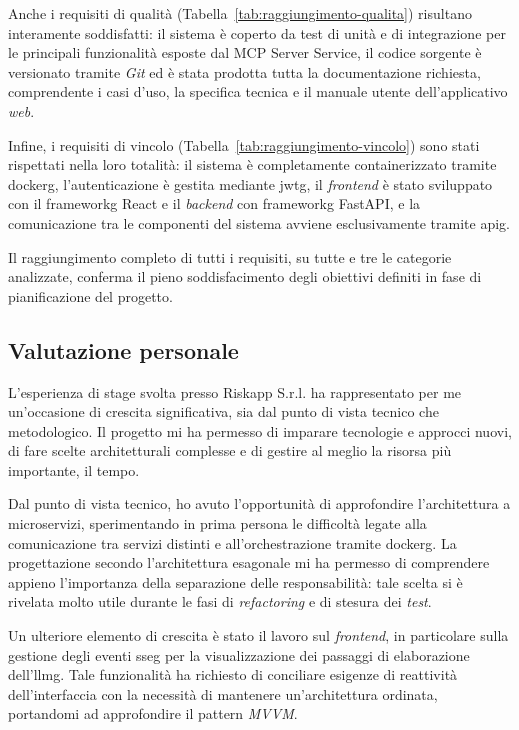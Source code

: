 Anche i requisiti di qualità (Tabella~\ref{tab:raggiungimento-qualita}) risultano 
interamente soddisfatti: il sistema è coperto da test di unità e di integrazione 
per le principali funzionalità esposte dal MCP Server Service, il codice 
sorgente è versionato tramite \textit{Git} ed è stata prodotta tutta la documentazione 
richiesta, comprendente i casi d'uso, la specifica tecnica e il manuale utente 
dell'applicativo \textit{web}.

Infine, i requisiti di vincolo (Tabella~\ref{tab:raggiungimento-vincolo}) sono stati 
rispettati nella loro totalità: il sistema è completamente containerizzato tramite 
\gls{dockerg}, l'autenticazione è gestita mediante \gls{jwtg}, il \textit{frontend} è 
stato sviluppato con il \gls{frameworkg} React e il \textit{backend} con \gls{frameworkg} 
FastAPI, e la comunicazione tra le componenti del sistema avviene esclusivamente tramite 
\gls{apig}.

Il raggiungimento completo di tutti i requisiti, su tutte e tre le categorie analizzate, 
conferma il pieno soddisfacimento degli obiettivi definiti in fase di pianificazione del 
progetto.


\subsection{Valutazione personale}

L'esperienza di stage svolta presso Riskapp S.r.l. ha rappresentato per me 
un'occasione di crescita significativa, sia dal punto di vista tecnico che metodologico. 
Il progetto mi ha permesso di imparare tecnologie e approcci nuovi, di fare scelte architetturali 
complesse e di gestire al meglio la risorsa più importante, il tempo.

Dal punto di vista tecnico, ho avuto l'opportunità di approfondire 
l'architettura a microservizi, sperimentando in prima persona le difficoltà legate alla 
comunicazione tra servizi distinti e all'orchestrazione tramite \gls{dockerg}. 
La progettazione secondo l'architettura 
esagonale mi ha permesso di comprendere appieno l'importanza della separazione 
delle responsabilità: tale scelta si è rivelata molto utile 
durante le fasi di \textit{refactoring} e di stesura dei \textit{test}.

Un ulteriore elemento di crescita è stato il lavoro sul \textit{frontend}, in particolare 
sulla gestione degli eventi \gls{sseg} per la visualizzazione 
dei passaggi di elaborazione dell'\gls{llmg}. Tale funzionalità ha richiesto di conciliare 
esigenze di reattività dell'interfaccia con la necessità di mantenere un'architettura 
ordinata, portandomi ad approfondire il pattern \textit{MVVM}.

